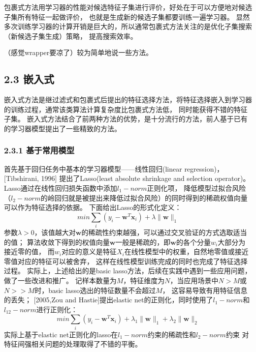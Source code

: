 \documentclass[a4paper,UTF8]{article}
\begin{document}
包裹式方法用学习器的性能对候选特征子集进行评价，好处在于可以方便地对候选子集所有特征一起做评价，
也就是生成新的候选子集都要训练一遍学习器。
显然多次训练学习器的计算开销是巨大的，所以通常包裹式方法关注的是优化子集搜索（新候选子集生成）策略，
提高搜索效率。

（感觉wrapper要凉了）较为简单地说一些方法。


\subsection*{2.3 嵌入式}

嵌入式方法是继过滤式和包裹式后提出的特征选择方法，将特征选择嵌入到学习器的训练过程，通常该类算法计算复杂度比包裹式方法低，
同时能获得不错的特征子集。
嵌入式方法结合了前两种方法的优势，是十分流行的方法，前人基于已有的学习器模型提出了一些精致的方法。

\subsubsection*{2.3.1 基于常用模型}

首先基于回归任务中基本的学习器模型——线性回归(linear regression)，[Tibshirani, 1996]
提出了Lasso(least absolute shrinkage and selection operator)。
Lasso通过在线性回归损失函数中添加$l_{1}-norm$正则化项，
降低模型过拟合风险（$l_{2}-norm$的岭回归就是被提出来降低过拟合风险）的同时得到的稀疏权值向量可以作为特征选择的依据。
下面给出Lasso的形式化定义：
$$ min \sum_{i}(y_{i}-\textbf{w}^{T}\textbf{x}_{i})+\lambda \parallel \textbf{w} \parallel _{1} $$
参数$\lambda>0$，该值越大对$\textbf{w}$的稀疏性约束越强，可以通过交叉验证的方式选取适当的值；
算法收敛下得到的权值向量$\textbf{w}$一般是稀疏的，即$\textbf{w}$的各个分量$w_{i}$大部分为接近零的值，
而$w_{i}$对应的意义是特征$X_{i}$在线性模型中的权重，自然地零值或接近零值对应的特征可以被舍弃，
这样在线性模型训练完成的同时也完成了特征选择过程。
实际上，上述给出的是basic lasso方法，后续在实践中遇到一些应用问题，做了一些改进和推广。
记样本数量为$M$，特征维度为$N$，当应用场景中$N>M$或$N>>M$时，basic lasso选出的特征数量不会超过$M$，
这容易导致有用特征信息的丢失；
[2005,Zou and Hastie]提出elastic net的正则化，同时使用了$l_{1}-norm$和$l_{12}-norm$进行正则化：
$$ min \sum_{i}(y_{i}-\textbf{w}^{T}\textbf{x}_{i})+
\lambda_{1} \parallel \textbf{w} \parallel _{1} +\lambda_{2} \parallel \textbf{w} \parallel _{2} $$
实际上基于elastic net正则化的lasso在$l_{1}-norm$约束的稀疏性和$l_{2}-norm$约束
对特征间强相关问题的处理取得了不错的平衡。
\end{document}
